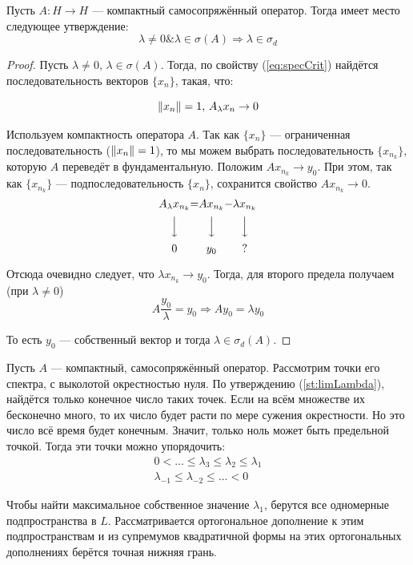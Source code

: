 \documentclass[12pt]{article}
\begin{document}
			\begin{theorem}
				Пусть $A: H \rightarrow H$ --- компактный самосопряжённый оператор. Тогда имеет место следующее утверждение:
				$$\lambda \neq 0 \& \lambda \in \sigma(A) \Rightarrow \lambda \in \sigma_d $$
			\end{theorem}
			\begin{proof}
				Пусть $\lambda \neq 0,\, \lambda \in \sigma(A)$. Тогда, по свойству (\ref{eq:specCrit}) найдётся последовательность 
				векторов $\{x_n\}$, такая, что:
		
				$$\left\| x_n \right\| = 1,\, A_{\lambda}x_n \rightarrow 0$$
		
				Используем компактность оператора $A$. Так как $\{x_n\}$ --- ограниченная последовательность ($\left\| x_n \right\| = 1$), то
				мы можем выбрать последовательность $\{x_{n_k}\}$, которую $A$ переведёт в фундаментальную. 
				Положим $Ax_{n_k}\rightarrow y_0$. При этом, так как $\{x_{n_k}\}$ --- подпоследовательность $\{x_{n}\}$, 
				сохранится свойство $Ax_{n_k} \rightarrow 0$.
				$$
				\begin{CD}
					A_{\lambda}x_{n_k} @.=@. Ax_{n_k} @.-@. \lambda x_{n_k} \\
					@VVV @. @VVV @. @VVV \\
					0 @.@. y_0 @.@. ?
				\end{CD}
				$$
		
				Отсюда очевидно следует, что $\lambda x_{n_k} \rightarrow y_0$. Тогда, для второго предела получаем (при $\lambda \neq 0$)
				$$A\dfrac{y_0}{\lambda} = y_0 \Rightarrow Ay_0 = \lambda y_0$$
		
				То есть $y_0$ --- собственный вектор и тогда $\lambda \in \sigma_d(A)$.
			\end{proof}
	
			Пусть $A$ --- компактный, самосопряжённый оператор. Рассмотрим точки его спектра, с выколотой окрестностью нуля. 
			По утверждению (\ref{st:limLambda}), найдётся только конечное число таких точек. Если на всём множестве их бесконечно много, 
			то их число будет расти по мере сужения окрестности. Но это число всё время будет конечным. Значит, только ноль может быть
			предельной точкой. Тогда эти точки можно упорядочить:
			\begin{gather*}
				0 < \dots \leq \lambda_3 \leq \lambda_2 \leq \lambda_1 \\
				\lambda_{-1} \leq \lambda_{-2} \leq \dots < 0
			\end{gather*}
	
			{\color{gray}Чтобы найти максимальное собственное значение $\lambda_1$, берутся все одномерные подпространства в $L$. 
			Рассматривается ортогональное дополнение к этим подпространствам и из супремумов квадратичной формы на
			этих ортогональных дополнениях берётся точная нижняя грань.}
	
\end{document}
